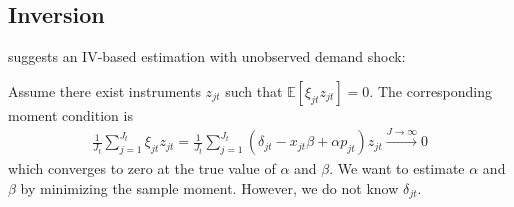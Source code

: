 \documentclass[11pt]{elegantbook}
\begin{document}
\subsection{Inversion}
\cite{berry1994estimating} suggests an IV-based estimation with unobserved demand shock:

Assume there exist instruments $z_{jt}$ such that $\mathbb{E}[\xi_{jt}z_{jt}]=0$. The corresponding moment condition is
\begin{equation}
    \begin{aligned}
        \frac{1}{J_t}\sum_{j=1}^{J_t}\xi_{jt}z_{jt}=\frac{1}{J_t}\sum_{j=1}^{J_t}\left(\delta_{jt}-x_{jt}\beta+\alpha p_{jt}\right)z_{jt} \stackrel{J \rightarrow \infty}{\longrightarrow} 0
    \end{aligned}
    \label{eq:iv_moment}
    \tag{Sample Moment}
\end{equation}
which converges to zero at the true value of $\alpha$ and $\beta$. We want to estimate $\alpha$ and $\beta$ by minimizing the sample moment. However, we do not know $\delta_{jt}$.
\end{document}
